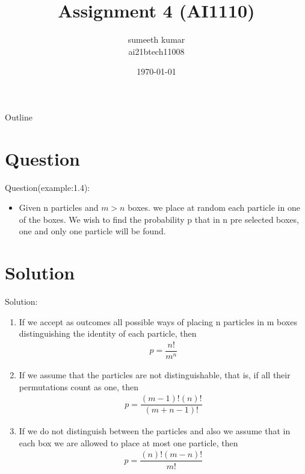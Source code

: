 \documentclass{beamer}
\title{Assignment 4 (AI1110)}
\author{sumeeth kumar\\
        ai21btech11008}
\date{\today}
\begin{document}
\begin{frame}
    \titlepage 
\end{frame}

\logo{}


\begin{frame}{Outline}
    \tableofcontents
\end{frame}


\section{Question}
\begin{frame}{Question(example:1.4):}

\begin{itemize}
    \item Given n particles and $m > n$ boxes. we place at random each particle in one of the 
boxes. We wish to find the probability p that in n pre selected boxes, one and only one particle will be found. 
\end{itemize}
\end{frame}
\section{Solution}
\begin{frame}{Solution:}
   \begin{enumerate}
       \item If we accept as outcomes all possible ways of placing n particles in m boxes distinguishing the identity of each particle, then
       \begin{align}
           p =\dfrac{n!}{m^n}        
           \end{align}
        \item If we assume that the particles are not distinguishable, that is, if all their permutations count as one, then
        \begin{align}
            p =\dfrac{(m-1)!(n)!}{(m+n-1)!} 
        \end{align}
         \item If we do not distinguish between the particles and also we assume that in each box we are allowed to place at most one particle, then 
         \begin{align}
             p =\dfrac{(n)!(m-n)!}{m!}
         \end{align}
     \end{enumerate}
    
\end{frame}
\end{document}
